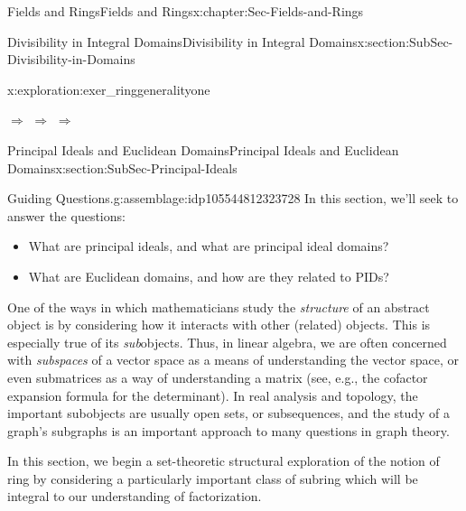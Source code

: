 \documentclass[oneside,10pt,]{book}
\numberwithin{equation}{section}
\begin{document}
\begin{chapterptx}{Fields and Rings}{}{Fields and Rings}{}{}{x:chapter:Sec-Fields-and-Rings}
\begin{sectionptx}{Divisibility in Integral Domains}{}{Divisibility in Integral Domains}{}{}{x:section:SubSec-Divisibility-in-Domains}
\begin{exploration}{}{x:exploration:exer_ringgeneralityone}
\par
\textunderscore{}\textunderscore{}\textunderscore{}\textunderscore{}\textunderscore{}\textunderscore{}\textunderscore{}\textunderscore{}\textunderscore{}\textunderscore{} \(\Rightarrow\) \textunderscore{}\textunderscore{}\textunderscore{}\textunderscore{}\textunderscore{}\textunderscore{}\textunderscore{}\textunderscore{}\textunderscore{}\textunderscore{} \(\Rightarrow\) \textunderscore{}\textunderscore{}\textunderscore{}\textunderscore{}\textunderscore{}\textunderscore{}\textunderscore{}\textunderscore{}\textunderscore{}\textunderscore{} \(\Rightarrow\) \textunderscore{}\textunderscore{}\textunderscore{}\textunderscore{}\textunderscore{}\textunderscore{}\textunderscore{}\textunderscore{}\textunderscore{}\textunderscore{}%
\end{exploration}%
\end{sectionptx}
%
%
\typeout{************************************************}
\typeout{************************************************}
%
\begin{sectionptx}{Principal Ideals and Euclidean Domains}{}{Principal Ideals and Euclidean Domains}{}{}{x:section:SubSec-Principal-Ideals}
\begin{assemblage}{Guiding Questions.}{g:assemblage:idp105544812323728}%
In this section, we'll seek to answer the questions: %
\begin{itemize}[label=\textbullet]
\item{}What are principal ideals, and what are principal ideal domains?%
\item{}What are Euclidean domains, and how are they related to PIDs?%
\end{itemize}
%
\end{assemblage}
One of the ways in which mathematicians study the \emph{structure} of an abstract object is by considering how it interacts with other (related) objects. This is especially true of its \emph{sub}objects. Thus, in linear algebra, we are often concerned with \emph{subspaces} of a vector space as a means of understanding the vector space, or even submatrices as a way of understanding a matrix (see, e.g., the cofactor expansion formula for the determinant). In real analysis and topology, the important subobjects are usually open sets, or subsequences, and the study of a graph's subgraphs is an important approach to many questions in graph theory.%
\par
In this section, we begin a set-theoretic structural exploration of the notion of ring by considering a particularly important class of subring which will be integral to our understanding of factorization.%

\end{sectionptx}
\end{chapterptx}
\end{document}
